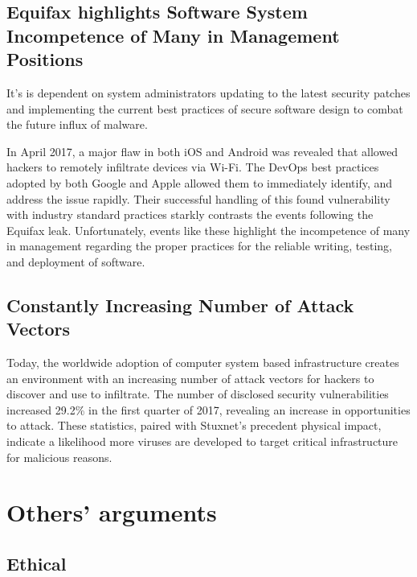 \documentclass[12pt]{article}
\begin{document}
\begin{multicols}{2}
\subsection{Equifax highlights Software System Incompetence of Many in Management Positions}

It's is dependent on system administrators updating to the latest security patches and implementing the current best practices of secure software design to combat the future influx of malware.

In April 2017, a major flaw in both iOS and Android was revealed that allowed hackers to remotely infiltrate devices via Wi-Fi. The DevOps best practices adopted by both Google and Apple allowed them to immediately identify, and address the issue rapidly.\cite{equifaxHack} Their successful handling of this found vulnerability with industry standard practices starkly contrasts the events following the Equifax leak. Unfortunately, events like these highlight the incompetence of many in management regarding the proper practices for the reliable writing, testing, and deployment of software.\cite{equifaxHack}

\subsection{Constantly Increasing Number of Attack Vectors}

Today, the worldwide adoption of computer system based infrastructure creates an environment with an increasing number of attack vectors for hackers to discover and use to infiltrate. The number of disclosed security vulnerabilities increased 29.2\% in the first quarter of 2017, revealing an increase in opportunities to attack. These statistics, paired with Stuxnet's precedent physical impact, indicate a likelihood more viruses are developed to target critical infrastructure for malicious reasons.\cite{industrialCyberVulnerabilities}

\section{Others' arguments}

\subsection{Ethical}


\end{multicols}
\end{document}
